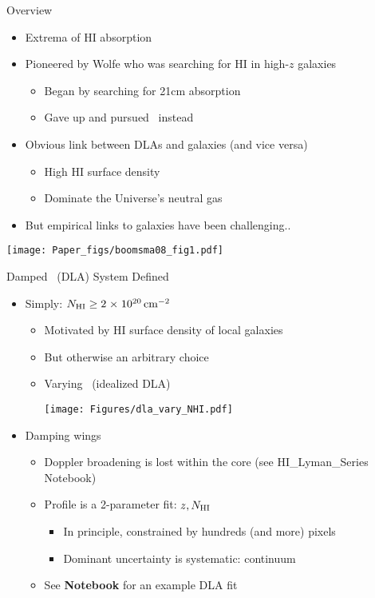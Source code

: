 \documentclass[12pt,letterpaper]{article}
\begin{document}

\begin{Aenumerate}

{\bf \item Overview}
 \begin{itemize}
 \item Extrema of HI absorption
 \item Pioneered by Wolfe who was searching for HI in high-$z$ galaxies
  \begin{itemize}
  \item Began by searching for 21cm absorption
  \item Gave up and pursued \lya\ instead
  \end{itemize}
 \item Obvious link between DLAs and galaxies (and vice versa)
  \begin{itemize}
  \item High HI surface density
  \item Dominate the Universe's neutral gas
  \end{itemize}
 \item But empirical links to galaxies have been challenging..
 \end{itemize}

  \texttt{[image: Paper\_figs/boomsma08\_fig1.pdf]}

{\bf \item Damped \lya\ (DLA) System Defined}
	\begin{itemize}

  	\item Simply: $N_{\rm HI} \ge 2 {\; \times \; 10^{20}} \, {\rm cm^{-2}}$
      \begin{itemize}
      \item Motivated by HI surface density of local galaxies 
      \item But otherwise an arbitrary choice
      \item Varying \nhi\ (idealized DLA)

  \texttt{[image: Figures/dla\_vary\_NHI.pdf]}

%

      \end{itemize}

    \item Damping wings
      \begin{itemize}
      \item Doppler broadening is lost within the core (see HI\_Lyman\_Series Notebook)
      \item Profile is a 2-parameter fit: $z, N_{\rm HI}$
        \begin{itemize}
        \item In principle, constrained by hundreds (and more) pixels
        \item Dominant uncertainty is systematic: continuum
        \end{itemize}
      \item See {\bf Notebook} for an example DLA fit
      \end{itemize}


\end{itemize}
\end{Aenumerate}
\end{document}
